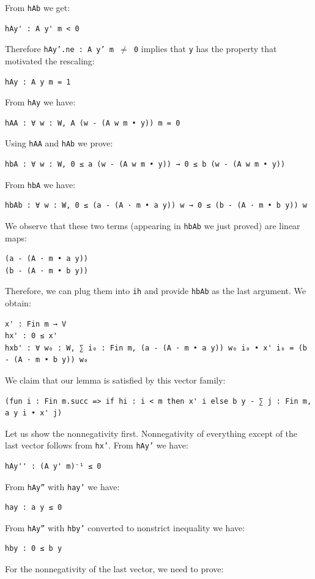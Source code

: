 \documentclass[]{article}
\renewcommand{\.}{\hskip .75pt}
\begin{document}
From \texttt{hAb} we get:
\begin{lstlisting}
hAy' : A y' m < 0
\end{lstlisting}
Therefore \texttt{hAy'.ne :~A y' m $\neq$ 0}
implies that \texttt{y} has the property that motivated the rescaling:
\begin{lstlisting}
hAy : A y m = 1
\end{lstlisting}
From \texttt{hAy} we have:
\begin{lstlisting}
hAA : ∀ w : W, A (w - (A w m • y)) m = 0
\end{lstlisting}
Using \texttt{hAA} and \texttt{hAb} we prove:
\begin{lstlisting}
hbA : ∀ w : W, 0 ≤ a (w - (A w m • y)) → 0 ≤ b (w - (A w m • y))
\end{lstlisting}
From \texttt{hbA} we have:
\begin{lstlisting}
hbAb : ∀ w : W, 0 ≤ (a - (A · m • a y)) w → 0 ≤ (b - (A · m • b y)) w
\end{lstlisting}
We observe that these two terms (appearing in \texttt{hbAb} we just proved) are linear maps:
\begin{lstlisting}
(a - (A · m • a y))
(b - (A · m • b y))
\end{lstlisting}
Therefore, we can plug them into \texttt{ih} and provide \texttt{hbAb} as the last argument.
We obtain:
\begin{lstlisting}
x' : Fin m → V
hx' : 0 ≤ x'
hxb' : ∀ w₀ : W, ∑ i₀ : Fin m, (a - (A · m • a y)) w₀ i₀ • x' i₀ = (b - (A · m • b y)) w₀
\end{lstlisting}
We claim that our lemma is satisfied by this vector family:
\begin{lstlisting}
(fun i : Fin m.succ => if hi : i < m then x' i else b y - ∑ j : Fin m, a y i • x' j)
\end{lstlisting}
Let us show the nonnegativity first.
Nonnegativity of everything except of the last vector follows from \texttt{hx'}.
From \texttt{hAy'} we have:
\begin{lstlisting}
hAy'' : (A y' m)⁻¹ ≤ 0
\end{lstlisting}
From \texttt{hAy''} with \texttt{hay'} we have:
\begin{lstlisting}
hay : a y ≤ 0
\end{lstlisting}
From \texttt{hAy''} with \texttt{hby'} converted to nonstrict inequality we have:
\begin{lstlisting}
hby : 0 ≤ b y
\end{lstlisting}
For the nonnegativity of the last vector, we need to prove:
\end{document}
